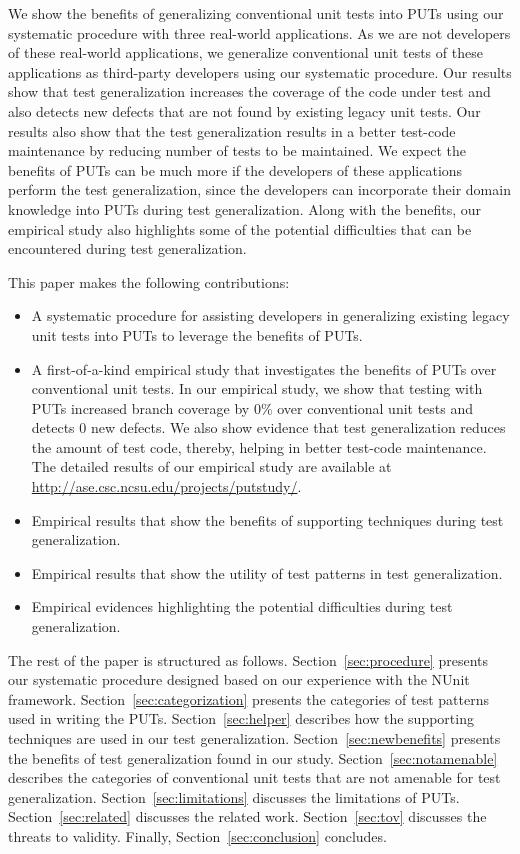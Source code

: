 We show the benefits of generalizing conventional unit tests into PUTs using our systematic procedure with three real-world applications. As we are not developers of these real-world applications, we generalize conventional unit tests of these applications as third-party developers using our systematic procedure. Our results show that test generalization increases the coverage of the code under test and also detects new defects that are not found by existing legacy unit tests. Our results also show that the test generalization results in a better test-code maintenance by reducing number of tests to be maintained. We expect the benefits of PUTs can be much more if the developers of these applications perform the test generalization, since the developers can incorporate their domain knowledge into PUTs during test generalization. Along with the benefits, our empirical study also highlights some of the potential difficulties that can be encountered during test generalization.

This paper makes the following contributions:

\begin{itemize}
	\item A systematic procedure for assisting developers in generalizing existing legacy unit tests into PUTs to leverage the benefits of PUTs.
	\item A first-of-a-kind empirical study that investigates the benefits of PUTs over conventional unit tests. In our empirical study, we show that testing with PUTs increased branch coverage by $0$\% over conventional unit tests and detects $0$ new defects. We also show evidence that test generalization reduces the amount of test code, thereby, helping in better test-code maintenance. The detailed results of our empirical study are available at \url{http://ase.csc.ncsu.edu/projects/putstudy/}.	
	\item Empirical results that show the benefits of supporting techniques during test generalization. 
	\item Empirical results that show the utility of test patterns in test generalization.
	\item Empirical evidences highlighting the potential difficulties during test generalization.
\end{itemize}

The rest of the paper is structured as follows. 
Section~\ref{sec:procedure} presents our systematic procedure designed based on our experience with the NUnit framework.
Section~\ref{sec:categorization} presents the categories of test patterns used in writing the PUTs. 
Section~\ref{sec:helper} describes how the supporting techniques are used in our test generalization. 
Section~\ref{sec:newbenefits} presents the benefits of test generalization found in our study. 
Section~\ref{sec:notamenable} describes the categories of conventional unit tests that are not amenable for test generalization.
Section~\ref{sec:limitations} discusses the limitations of PUTs. Section~\ref{sec:related} discusses the related work. Section~\ref{sec:tov} discusses the threats to validity. Finally, Section~\ref{sec:conclusion} concludes.
